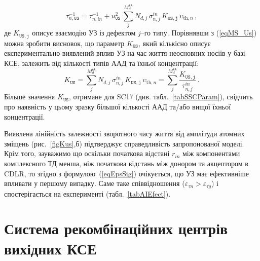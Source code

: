 \begin{equation}
\tau_{n,\mathtt{US}}^{-1}=\tau_{n,in}^{-1}+
u_{\mathtt{US}}^2\,\sum_j^{M_d^\mathtt{AA}}N_{d,j}\,\sigma_{n,j}^{in}\,K_\mathtt{US,j}\,\upsilon_{\mathrm{th},n}\,,
\end{equation}
де $K_\mathtt{US,j}$ описує взаємодію УЗ із дефектом $j$--го типу.
Порівнявши з (\ref{eqMS_Us}) можна зробити висновок, що параметр $K_\mathtt{US}$, який кількісно описує експериментально виявлений вплив УЗ на час життя неосновних носіїв у базі КСЕ,
залежить від кількості типів ААД та їхньої концентрації:
\begin{equation}
\label{eqKUS}
K_\mathtt{US}=\sum_j^{M_d^\mathtt{AA}}N_{d,j}\,\sigma_{n,j}^{in}\,K_\mathtt{US,j}\,\upsilon_{\mathrm{th},n}=\sum_j^{M_d^\mathtt{AA}}\frac{K_\mathtt{US,j}}{\tau_{n,j}^{in}}\,.
\end{equation}
Більше значення $K_\mathtt{US}$, отримане для SC17 (див. табл.~\ref{tabSSCParam}), свідчить про наявність у цьому зразку більшої кількості ААД та/або вищої їхньої концентрації.

Виявлена лінійність залежності зворотного часу життя від амплітуди атомних зміщень (рис.~\ref{figKus},б) підтверджує
справедливість запропонованої моделі.
Крім того, зауважимо що оскільки початкова відстані $r_{in}$ між компонентами комплексного ТД  менша, ніж початкова відстань між донором та акцептором в CDLR,
то згідно з формулою~(\ref{eqEpsSig}) очікується, що УЗ має ефективніше впливати у першому випадку.
Саме таке співвідношення ($\varepsilon_{\tau n}>\varepsilon_{\tau g}$) і спостерігається на експерименті (табл.~\ref{tabAIEfect}).







\section{Система рекомбінаційних центрів вихідних КСЕ\label{sBulyrMethod}}

